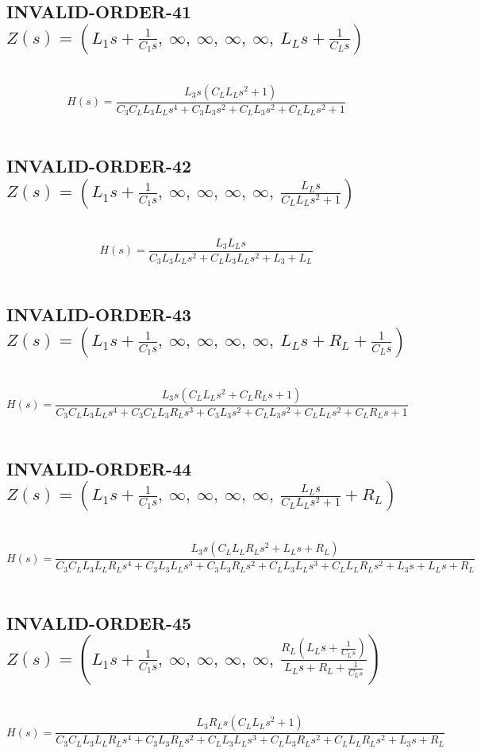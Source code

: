 \documentclass{article}
\begin{document}
\subsection{INVALID-ORDER-41 $Z(s) = \left( L_{1} s + \frac{1}{C_{1} s}, \  \infty, \  \infty, \  \infty, \  \infty, \  L_{L} s + \frac{1}{C_{L} s}\right)$ } \ 
\textbf{\[H(s) = \frac{L_{3} s \left(C_{L} L_{L} s^{2} + 1\right)}{C_{3} C_{L} L_{3} L_{L} s^{4} + C_{3} L_{3} s^{2} + C_{L} L_{3} s^{2} + C_{L} L_{L} s^{2} + 1}\] } \ 
\subsection{INVALID-ORDER-42 $Z(s) = \left( L_{1} s + \frac{1}{C_{1} s}, \  \infty, \  \infty, \  \infty, \  \infty, \  \frac{L_{L} s}{C_{L} L_{L} s^{2} + 1}\right)$ } \ 
\textbf{\[H(s) = \frac{L_{3} L_{L} s}{C_{3} L_{3} L_{L} s^{2} + C_{L} L_{3} L_{L} s^{2} + L_{3} + L_{L}}\] } \ 
\subsection{INVALID-ORDER-43 $Z(s) = \left( L_{1} s + \frac{1}{C_{1} s}, \  \infty, \  \infty, \  \infty, \  \infty, \  L_{L} s + R_{L} + \frac{1}{C_{L} s}\right)$ } \ 
\textbf{\[H(s) = \frac{L_{3} s \left(C_{L} L_{L} s^{2} + C_{L} R_{L} s + 1\right)}{C_{3} C_{L} L_{3} L_{L} s^{4} + C_{3} C_{L} L_{3} R_{L} s^{3} + C_{3} L_{3} s^{2} + C_{L} L_{3} s^{2} + C_{L} L_{L} s^{2} + C_{L} R_{L} s + 1}\] } \ 
\subsection{INVALID-ORDER-44 $Z(s) = \left( L_{1} s + \frac{1}{C_{1} s}, \  \infty, \  \infty, \  \infty, \  \infty, \  \frac{L_{L} s}{C_{L} L_{L} s^{2} + 1} + R_{L}\right)$ } \ 
\textbf{\[H(s) = \frac{L_{3} s \left(C_{L} L_{L} R_{L} s^{2} + L_{L} s + R_{L}\right)}{C_{3} C_{L} L_{3} L_{L} R_{L} s^{4} + C_{3} L_{3} L_{L} s^{3} + C_{3} L_{3} R_{L} s^{2} + C_{L} L_{3} L_{L} s^{3} + C_{L} L_{L} R_{L} s^{2} + L_{3} s + L_{L} s + R_{L}}\] } \ 
\subsection{INVALID-ORDER-45 $Z(s) = \left( L_{1} s + \frac{1}{C_{1} s}, \  \infty, \  \infty, \  \infty, \  \infty, \  \frac{R_{L} \left(L_{L} s + \frac{1}{C_{L} s}\right)}{L_{L} s + R_{L} + \frac{1}{C_{L} s}}\right)$ } \ 
\textbf{\[H(s) = \frac{L_{3} R_{L} s \left(C_{L} L_{L} s^{2} + 1\right)}{C_{3} C_{L} L_{3} L_{L} R_{L} s^{4} + C_{3} L_{3} R_{L} s^{2} + C_{L} L_{3} L_{L} s^{3} + C_{L} L_{3} R_{L} s^{2} + C_{L} L_{L} R_{L} s^{2} + L_{3} s + R_{L}}\] } \ 
\end{document}
